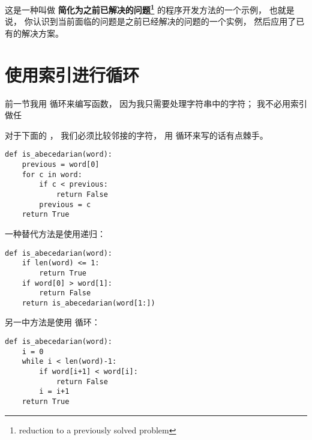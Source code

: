 这是一种叫做 {\bf 简化为之前已解决的问题\footnote{reduction to a
previously solved problem}} 的程序开发方法的一个示例，
也就是说， 你认识到当前面临的问题是之前已经解决的问题的一个实例，
然后应用了已有的解决方案。


\section{使用索引进行循环}
  
  


前一节我用  循环来编写函数， 因为我只需要处理字符串中的字符；
我不必用索引做任


对于下面的  ， 我们必须比较邻接的字符， 用  循环来写的话有点棘手。

\begin{lstlisting}
def is_abecedarian(word):
    previous = word[0]
    for c in word:
        if c < previous:
            return False
        previous = c
    return True
\end{lstlisting}


一种替代方法是使用递归：

\begin{lstlisting}
def is_abecedarian(word):
    if len(word) <= 1:
        return True
    if word[0] > word[1]:
        return False
    return is_abecedarian(word[1:])
\end{lstlisting}


另一中方法是使用  循环：

\begin{lstlisting}
def is_abecedarian(word):
    i = 0
    while i < len(word)-1:
        if word[i+1] < word[i]:
            return False
        i = i+1
    return True
\end{lstlisting}

